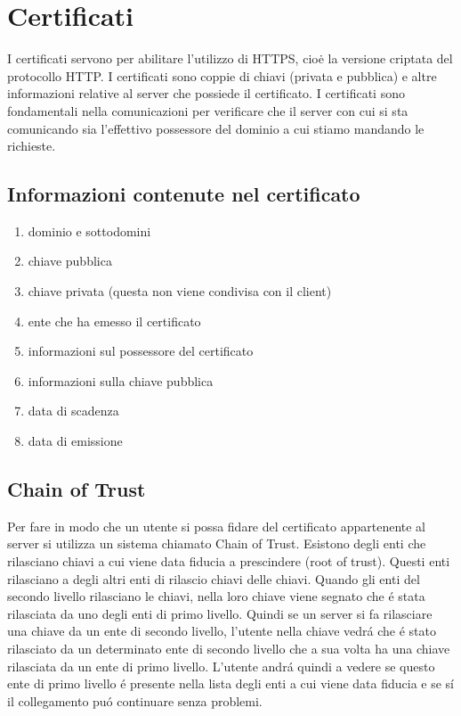 \section{Certificati}
\cite{certificates}
I certificati servono per abilitare l'utilizzo di HTTPS, cioė la versione criptata del protocollo HTTP. I certificati sono coppie di chiavi (privata e pubblica) e altre informazioni relative al server che possiede il certificato. I certificati sono fondamentali nella comunicazioni per verificare che il server con cui si sta comunicando sia l'effettivo possessore del dominio a cui stiamo mandando le richieste.
\subsection{Informazioni contenute nel certificato}
\begin{enumerate}
  \item dominio e sottodomini
  \item chiave pubblica
  \item chiave privata (questa non viene condivisa con il client)
  \item ente che ha emesso il certificato
  \item informazioni sul possessore del certificato
  \item informazioni sulla chiave pubblica
  \item data di scadenza
  \item data di emissione

\end{enumerate}
\subsection{Chain of Trust}
Per fare in modo che un utente si possa fidare del certificato appartenente al server si utilizza un sistema chiamato Chain of Trust. Esistono degli enti che rilasciano chiavi a cui viene data fiducia a prescindere (root of trust). Questi enti rilasciano a degli altri enti di rilascio chiavi delle chiavi. Quando gli enti del secondo livello rilasciano le chiavi, nella loro chiave viene segnato che é stata rilasciata da uno degli enti di primo livello. Quindi se un server si fa rilasciare una chiave da un ente di secondo livello, l'utente nella chiave vedrá che é stato rilasciato da un determinato ente di secondo livello che a sua volta ha una chiave rilasciata da un ente di primo livello. L'utente andrá quindi a vedere se questo ente di primo livello é presente nella lista degli enti a cui viene data fiducia e se sí il collegamento puó continuare senza problemi.

